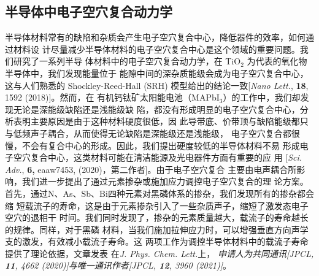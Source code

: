   

\subsection{半导体中电子空穴复合动力学}

半导体材料常有的缺陷和杂质会产生电子空穴复合中心，降低器件的效率，如何通过材料设
计尽量减少半导体材料的电子空穴复合中心是这个领域的重要问题。我们研究了一系列半导
体材料中的电子空穴复合动力学，在 TiO$_2$ 为代表的氧化物半导体中，我们发现能量位于
能隙中间的深杂质能级会成为电子空穴复合中心，这与人们熟悉的 Shockley-Reed-Hall
(SRH) 模型给出的结论一致[\textit{Nano Lett.}, \textbf{18}, 1592 (2018)]。然而，在
有机钙钛矿太阳能电池（MAPbI$_3$）的工作中，我们却发现无论是深能级缺陷还是浅能级缺
陷，都没有形成明显的电子空穴复合中心，分析表明主要原因是由于这种材料硬度很低，因
此导带底、价带顶与缺陷能级都只与低频声子耦合，从而使得无论缺陷是深能级还是浅能级，
电子空穴复合都很慢，不会有复合中心的形成。因此，我们提出硬度较低的半导体材料不易
形成电子空穴复合中心，这类材料可能在清洁能源及光电器件方面有重要的应
用 [\textit{Sci. Adv.}, \textbf{6,} eaaw7453, (2020)，第二作者]。由于电子空穴复合
主要由电声耦合所影响，我们进一步提出了通过元素掺杂或施加应力调控电子空穴复合的理
论方案。首先，通过N、As、Sb、Bi四种元素对黑磷体系的掺杂，我们发现所有的掺杂都会缩
短载流子的寿命，这是由于元素掺杂引入了一些杂质声子，缩短了激发态电子空穴的退相干
时间。我们同时发现了，掺杂的元素质量越大，载流子的寿命越长的规律。同样，对于黑磷
材料，当我们施加拉伸应力时，可以增强垂直方向声学支的激发，有效减小载流子寿命。这
两项工作为调控半导体材料中的载流子寿命提供了理论依据，文章发表
在\textit{J. Phys. Chem. Lett.}上， \emph{申请人为共同通讯[\textit{JPCL},
  \textbf{11}, 4662 (2020)]与唯一通讯作者[\textit{JPCL}, \textbf{12}, 3960
  (2021)]}。


